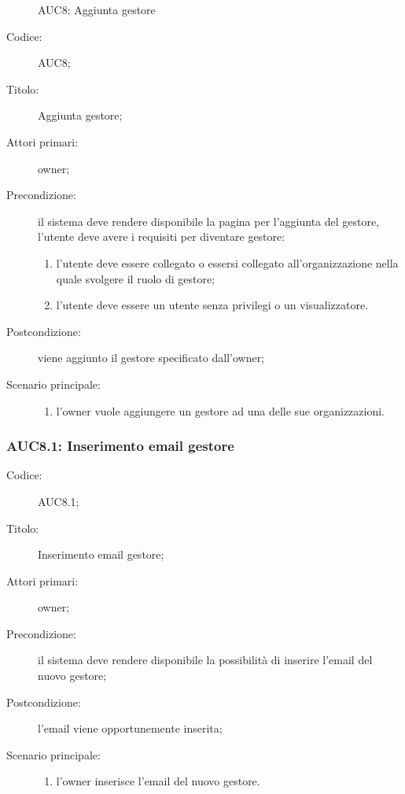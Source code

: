 \documentclass[../../../analisi-dei-requisiti.tex]{subfiles}
\begin{document}
\begin{figure}[H]
  \centering
  \caption{AUC8: Aggiunta gestore}%
  \label{fig:AUC8}
\end{figure}

\begin{description}
  \item[Codice:] AUC8;
  \item[Titolo:] Aggiunta gestore;
  \item[Attori primari:] owner;
  \item[Precondizione:] il sistema deve rendere disponibile la pagina per l'aggiunta del gestore, l'utente deve avere i requisiti per diventare gestore:
  \begin{enumerate}
    \item l'utente deve essere collegato o essersi collegato all'organizzazione nella quale svolgere il ruolo di gestore;
    \item l'utente deve essere un utente senza privilegi o un visualizzatore.
  \end{enumerate}
  \item[Postcondizione:] viene aggiunto il gestore specificato dall'owner;
  \item[Scenario principale:]
  \begin{enumerate}
    \item l'owner vuole aggiungere un gestore ad una delle sue organizzazioni.
  \end{enumerate}
\end{description}

\subsubsection{AUC8.1: Inserimento email gestore}%
\label{subs:AUC8.1}
\begin{description}
  \item[Codice:] AUC8.1;
  \item[Titolo:] Inserimento email gestore;
  \item[Attori primari:] owner;
  \item[Precondizione:] il sistema deve rendere disponibile la possibilità di inserire l'email del nuovo gestore;
  \item[Postcondizione:] l'email viene opportunemente inserita;
  \item[Scenario principale:]
  \begin{enumerate}
    \item l'owner inserisce l'email del nuovo gestore.
  \end{enumerate}
\end{description}
\end{document}

